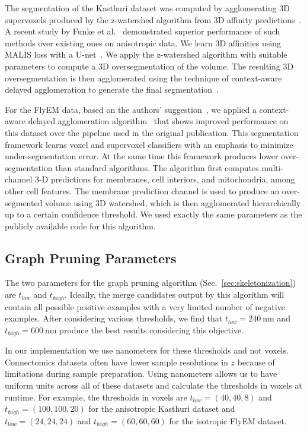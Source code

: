 The segmentation of the Kasthuri dataset was computed by agglomerating 3D supervoxels produced by the z-watershed algorithm from 3D affinity predictions~\cite{zlateski2015image}. A recent study by Funke et al.~\cite{funke2017deep} demonstrated superior performance of such methods over existing ones on anisotropic data. We learn 3D affinities using MALIS loss with a U-net~\cite{ronneberger2015u,Turaga:2009}. We apply the z-watershed algorithm with suitable parameters to compute a 3D oversegmentation of the volume. The resulting 3D oversegmentation is then agglomerated using the technique of context-aware delayed agglomeration to generate the final segmentation~\cite{10.1371/journal.pone.0125825}.

For the FlyEM data, based on the authors' suggestion~\cite{takemura2017connectome}, we applied a context-aware delayed agglomeration algorithm~\cite{10.1371/journal.pone.0125825} that shows improved performance on this dataset over the pipeline used in the original publication. This segmentation framework learns voxel and supervoxel classifiers with an emphasis to minimize under-segmentation error. At the same time this framework produces lower over-segmentation than standard algorithms. The algorithm first computes multi-channel 3-D predictions for membranes, cell interiors, and mitochondria, among other cell features. The membrane prediction channel is used to produce an over-segmented volume using 3D watershed, which is then agglomerated hierarchically up to a certain confidence threshold. We used exactly the same parameters as the publicly available code for this algorithm.

\subsection{Graph Pruning Parameters}

The two parameters for the graph pruning algorithm (Sec.~\ref{sec:skeletonization}) are $t_{low}$ and $t_{high}$. Ideally, the merge candidates output by this algorithm will contain all possible positive examples with a very limited number of negative examples. After considering various thresholds, we find that $t_{low} = \SI{240}{\nano\meter}$ and $t_{high} = \SI{600}{\nano\meter}$ produce the best results considering this objective.

In our implementation we use nanometers for these thresholds and not voxels. Connectomics datasets often have lower sample resolutions in $z$ because of limitations during sample preparation. Using nanometers allows us to have uniform units across all of these datasets and calculate the thresholds in voxels at runtime. For example, the thresholds in voxels are $t_{low} = (40, 40, 8)$ and $t_{high} = (100, 100, 20)$ for the anisotropic Kasthuri dataset and $t_{low} = (24, 24, 24)$ and $t_{high} = (60, 60, 60)$ for the isotropic FlyEM dataset.

